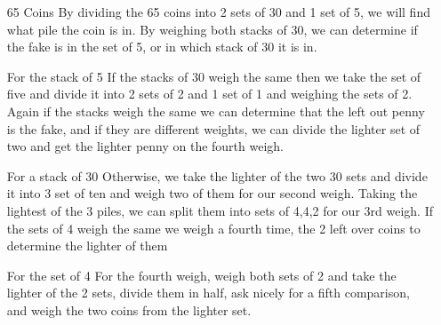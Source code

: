\documentclass[12pt,largemargins]{homework}
\begin{document}
\begin{itemize}
\item[65 Coins] 
By dividing the 65 coins into 2 sets of 30 and 1 set of 5, we will find what pile the coin is in. By weighing both stacks of 30, we can determine if the fake is in the set of 5, or in which stack of 30 it is in.
\item[For the stack of 5] If the stacks of 30 weigh the same then we take the set of five and divide it into 2 sets of 2 and 1 set of 1 and weighing the sets of 2. Again if the stacks weigh the same we can determine that the left out penny is the fake, and if they are different weights, we can divide the lighter set of two and get the lighter penny on the fourth weigh.
\item[For a stack of 30]
Otherwise, we take the lighter of the two 30 sets and divide it into 3 set of ten and weigh two of them for our second weigh. Taking the lightest of the 3 piles, we can split them into sets of 4,4,2 for our 3rd weigh. If the sets of 4 weigh the same we weigh a fourth time, the 2 left over coins to determine the lighter of them
\item[For the set of 4]
For the fourth weigh, weigh both sets of 2 and take the lighter of the 2 sets, divide them in half, ask nicely for a fifth comparison, and weigh the two coins from the lighter set.\\
\end{itemize}
\end{document}
